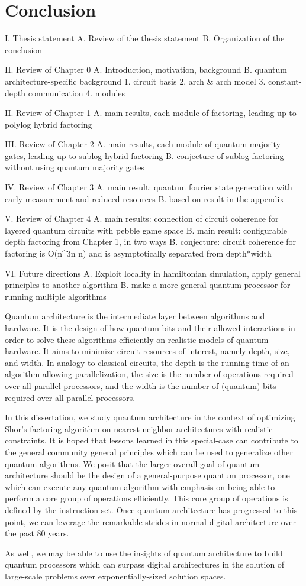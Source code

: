 \chapter{Conclusion}
\label{chap:conclude}

I. Thesis statement
	A. Review of the thesis statement
	B. Organization of the conclusion

II. Review of Chapter 0
	A. Introduction, motivation, background
	B. quantum architecture-specific background
		1. circuit basis
		2. arch & arch model
		3. constant-depth communication
		4. modules

II. Review of Chapter 1
	A. main results, each module of factoring, leading up to polylog hybrid factoring

III. Review of Chapter 2
	A. main results, each module of quantum majority gates, leading up to sublog hybrid factoring
	B. conjecture of sublog factoring without using quantum majority gates

IV. Review of Chapter 3
	A. main result: quantum fourier state generation with early measurement and reduced resources
	B. based on result in the appendix

V. Review of Chapter 4
	A. main results: connection of circuit coherence for layered quantum circuits with pebble game space
	B. main result: configurable depth factoring from Chapter 1, in two ways
	B. conjecture: circuit coherence for factoring is O(n^3\log n \log\log n) and is asymptotically separated from depth*width

VI. Future directions
	A. Exploit locality in hamiltonian simulation, apply general principles to another algorithm
	B. make a more general quantum processor for running multiple algorithms

Quantum architecture is the intermediate layer between algorithms and hardware.
It is the design of how quantum bits and their allowed interactions in order
to solve these algorithms efficiently on realistic models of quantum hardware.
It aims to minimize circuit resources of interest, namely depth, size, and
width. In analogy to classical circuits, the depth is the running time of an
algorithm allowing parallelization, the size is the number of operations
required over all parallel processors, and the width is the number of
(quantum) bits required over all parallel processors.

In this dissertation, we study quantum architecture in the context of
optimizing Shor's factoring algorithm on nearest-neighbor architectures with
realistic constraints. It is hoped that lessons learned in this special-case
can contribute to the general community general principles which can be used
to generalize other quantum algorithms. We posit that the larger overall goal
of quantum architecture should be the design of a general-purpose quantum
processor, one which can execute any quantum algorithm with emphasis on being
able to perform a core group of operations efficiently. This core group of
operations is defined by the instruction set. Once quantum architecture has
progressed to this point, we can leverage the remarkable strides in normal
digital architecture over the past 80 years.

As well, we may be able to use the insights of quantum architecture to build
quantum processors which can surpass digital architectures in the solution of
large-scale problems over exponentially-sized solution spaces.
